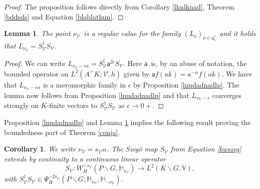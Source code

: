 \documentclass[a4paper,reqno]{amsart}
\numberwithin{equation}{section}
\def\C{\mathbb{C}}
\newtheorem{cor}[thm]{Corollary}
\newtheorem{lemma}[thm]{Lemma}
\theoremstyle{definition}
\theoremstyle{remark}
\begin{document}
\begin{proof}
The proposition follows directly from Corollary \ref{lknlknad}, Theorem \ref{bddsds} and Equation \eqref{blablathun}.
\end{proof}

\begin{lemma}
\label{lnudadnadlplemma}
The point $\nu_\mathcal{V}$ is a regular value for the family $(L_\nu)_{\nu \in \mathfrak{a}^*_\C}$ and it holds that $L_{\nu_{\mathcal{V}}}=S_{\mathcal{V}}^\dagger S_{\mathcal{V}}$.
\end{lemma}

\begin{proof}
We can write $L_{\nu_{\mathcal{V}}-\epsilon\alpha}=S_{\mathcal{V}}^\dagger \mathsf{a}^{2\epsilon}S_{\mathcal{V}}$. Here $\mathsf{a}$ is, by an abuse of notation, the bounded operator on $L^2(A^+K;\mathcal{V}, h)$ given by $\mathsf{a}f(ak)=a^{-\alpha}f(ak)$. We have that $L_{\nu_{\mathcal{V}}-\epsilon\alpha}$ is a meromorphic family in $\epsilon$ by Proposition \ref{lnudadnadlp}. The lemma now follows from Proposition \ref{lnudadnadlp} and that $L_{\nu_{\mathcal{V}}-\epsilon}$ converges strongly on $K$-finite vectors to $S_{\mathcal{V}}^\dagger S_{\mathcal{V}}$ as $\epsilon \to 0+$.
\end{proof}

Proposition \ref{lnudadnadlp} and Lemma \ref{lnudadnadlplemma} implies the following result proving the boundedness part of Theorem \ref{conja}.


\begin{cor}
\label{proofofthema}
We write $\nu_{\mathcal{V}}=s_{\mathcal{V}}\alpha$. The Szegö map $S_{\mathcal{V}}$ from Equation \eqref{kwszeg} extends by continuity to a continuous linear operator
$$S_{\mathcal{V}}: W^{-s_\mathcal{V}}_{H}(P\backslash G, \mathbb{H}_{\nu_{\mathcal{V}}})\to L^2(K \backslash G,\mathbb{V}),$$
with $S_{\mathcal{V}}^\dagger S_{\mathcal{V}}\in \Psi^{-2s_\mathcal{V}}_H(P\backslash G; \mathbb{H}_{\nu_{\mathcal{V}}},\mathbb{H}_{-\nu_{\mathcal{V}}})$. 
\end{cor}
\end{document}
